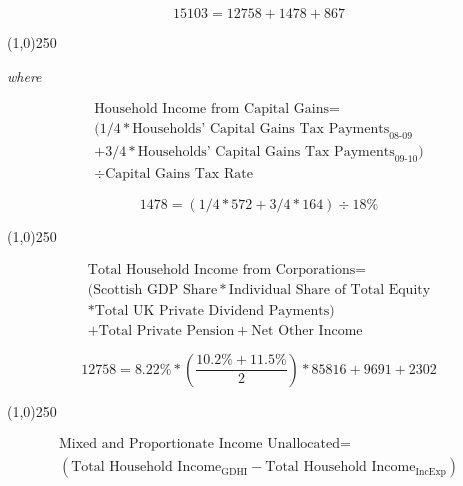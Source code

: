 \begin{enumerate}
\begin{equation} \nonumber
15103 = 12758+1478+867
\end{equation}

\begin{center}
\line(1,0){250}
\end{center}


\textit{where}

\begin{equation}
\begin{split}
\text{Household Income from Capital Gains} = \\
(1/4 *\text{Households' Capital Gains Tax Payments}_\text{08-09}\\
+ 3/4 *\text{Households' Capital Gains Tax Payments}_\text{09-10})\\
\div \text{Capital Gains Tax Rate}
\end{split} \label{eq:2.5.5}
\end{equation}

\begin{equation} \nonumber
1478 = (1/4*572+3/4*164)\div 18\%
\end{equation}

\begin{center}
\line(1,0){250}
\end{center}

\newpage


\begin{equation}
\begin{split}
\text{Total Household Income from Corporations} = \\
(\text{Scottish GDP Share}*\text{Individual Share of Total Equity}\\
*\text{Total UK Private Dividend Payments})\\
+ \text{Total Private Pension}+ \text{Net Other Income}
\end{split} \label{eq:2.5.6}
\end{equation}

\begin{equation} \nonumber
12758 = 8.22\% * (\frac{10.2\%+11.5\%}{2}) * 85816+9691+2302
\end{equation}

\begin{center}
\line(1,0){250}
\end{center}


\begin{equation}
\begin{split}
\text{Mixed and Proportionate Income Unallocated} = \\
(\text{Total Household Income}_\text{GDHI}-\text{Total Household Income}_\text{IncExp})\\
\end{split} \label{eq:2.5.7}
\end{equation}


\end{enumerate}
